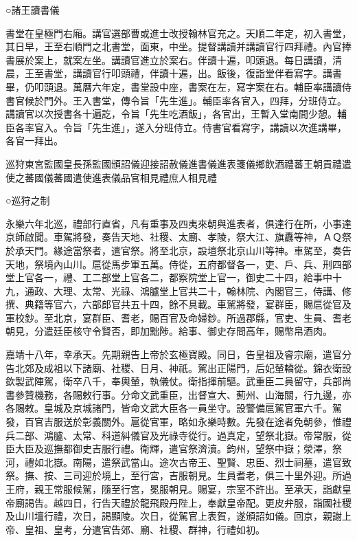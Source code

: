 ○諸王讀書儀

書堂在皇極門右廂。講官選部曹或進士改授翰林官充之。天順二年定，初入書堂，其日早，王至右順門之北書堂，面東，中坐。提督講讀并講讀官行四拜禮。內官捧書展於案上，就案左坐。講讀官進立於案右。伴讀十遍，叩頭退。每日講讀，清晨，王至書堂，講讀官行叩頭禮，伴讀十遍，出。飯後，復詣堂伴看寫字。講書畢，仍叩頭退。萬曆六年定，書堂設中座，書案在左，寫字案在右。輔臣率講讀侍書官候於門外。王入書堂，傳令旨「先生進」。輔臣率各官入，四拜，分班侍立。講讀官以次授書各十遍訖，令旨「先生吃酒飯」，各官出，王暫入堂南間少憩。輔臣各率官入。令旨「先生進」，遂入分班侍立。侍書官看寫字，講讀以次進講畢，各官一拜出。

巡狩東宮監國皇長孫監國頒詔儀迎接詔赦儀進書儀進表箋儀鄉飲酒禮蕃王朝貢禮遣使之蕃國儀蕃國遣使進表儀品官相見禮庶人相見禮

○巡狩之制

永樂六年北巡，禮部行直省，凡有重事及四夷來朝與進表者，俱達行在所，小事達京師啟聞。車駕將發，奏告天地、社稷、太廟、孝陵，祭大江、旗纛等神，ＡＱ祭於承天門。緣途當祭者，遣官祭。將至北京，設壇祭北京山川等神。車駕至，奏告天地，祭境內山川。扈從馬步軍五萬。侍從，五府都督各一，吏、戶、兵、刑四部堂上官各一，禮、工二部堂上官各二，都察院堂上官一，御史二十四，給事中十九，通政、大理、太常、光祿、鴻臚堂上官共二十，翰林院、內閣官三，侍講、修撰、典籍等官六，六部郎官共五十四，餘不具載。車駕將發，宴群臣，賜扈從官及軍校鈔。至北京，宴群臣、耆老，賜百官及命婦鈔。所過郡縣，官吏、生員、耆老朝見，分遣廷臣核守令賢否，即加黜陟。給事、御史存問高年，賜幣帛酒肉。

嘉靖十八年，幸承天。先期親告上帝於玄極寶殿。同日，告皇祖及睿宗廟，遣官分告北郊及成祖以下諸廟、社稷、日月、神祇。駕出正陽門，后妃輦轎從。錦衣衛設欽製武陣駕，衛卒八千，奉輿輦，執儀仗。衛指揮前驅。武重臣二員留守，兵部尚書參贊機務，各賜敕行事。分命文武重臣，出督宣大、薊州、山海關，行九邊，亦各賜敕。皇城及京城諸門，皆命文武大臣各一員坐守。設警備扈駕官軍六千。駕發，百官吉服送於彰義關外。扈從官軍，略如永樂時數。先發在途者免朝參，惟禮兵二部、鴻臚、太常、科道糾儀官及光祿寺從行。過真定，望祭北嶽。帝常服，從臣大臣及巡撫都御史吉服行禮。衛輝，遣官祭濟瀆。鈞州，望祭中嶽；滎澤，祭河，禮如北嶽。南陽，遣祭武當山。途次古帝王、聖賢、忠臣、烈士祠墓，遣官致祭。撫、按、三司迎於境上，至行宮，吉服朝見。生員耆老，俱三十里外迎。所過王府，親王常服候駕，隨至行宮，冕服朝見。賜宴，宗室不許出。至承天，詣獻皇帝廟謁告。越四日，行告天禮於龍飛殿丹陛上，奉獻皇帝配。更皮弁服，詣國社稷及山川壇行禮，次日，謁顯陵。次日，從駕官上表賀，遂頒詔如儀。回京，親謝上帝、皇祖、皇考，分遣官告郊、廟、社稷、群神，行禮如初。

